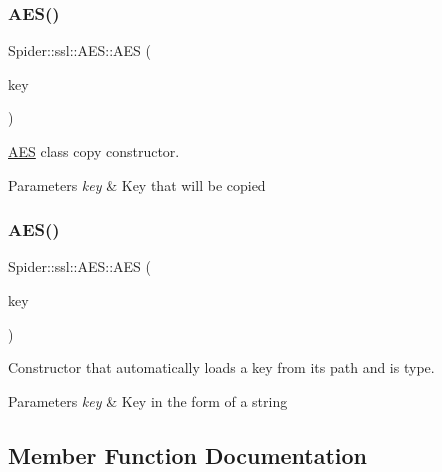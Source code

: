 \subsubsection{\texorpdfstring{A\+E\+S()}{AES()}\hspace{0.1cm}{\footnotesize\ttfamily [1/2]}}
{\footnotesize\ttfamily Spider\+::ssl\+::\+A\+E\+S\+::\+A\+ES (\begin{DoxyParamCaption}\item[{const \hyperlink{class_spider_1_1ssl_1_1_a_e_s}{A\+ES} \&}]{key }\end{DoxyParamCaption})}



\hyperlink{class_spider_1_1ssl_1_1_a_e_s}{A\+ES} class copy constructor. 


\begin{DoxyParams}{Parameters}
{\em key} & Key that will be copied \\
\hline
\end{DoxyParams}
\mbox{\label{class_spider_1_1ssl_1_1_a_e_s_ae588c5d1794e8cbe1cc74cf4ffc8b276}} 
\subsubsection{\texorpdfstring{A\+E\+S()}{AES()}\hspace{0.1cm}{\footnotesize\ttfamily [2/2]}}
{\footnotesize\ttfamily Spider\+::ssl\+::\+A\+E\+S\+::\+A\+ES (\begin{DoxyParamCaption}\item[{const unsigned char $\ast$}]{key }\end{DoxyParamCaption})}



Constructor that automatically loads a key from its path and is type. 


\begin{DoxyParams}{Parameters}
{\em key} & Key in the form of a string \\
\hline
\end{DoxyParams}


\subsection{Member Function Documentation}
\mbox{\label{class_spider_1_1ssl_1_1_a_e_s_a16b092b57a8906edc6845176eed10256}} 
